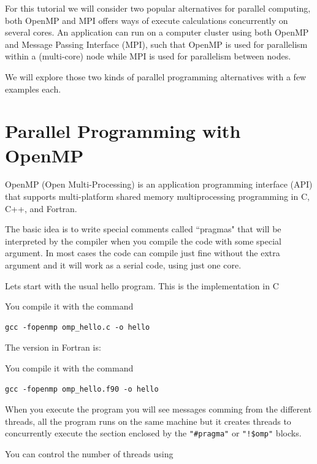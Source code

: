 For this tutorial we will consider two popular alternatives for parallel computing, both OpenMP and MPI offers ways of execute calculations concurrently on several cores.
An application can run on a computer cluster using both OpenMP and Message Passing Interface (MPI), such that OpenMP is used for parallelism within a (multi-core) node while MPI is used for parallelism between nodes.

We will explore those two kinds of parallel programming alternatives with a few examples each.

\section{Parallel Programming with OpenMP}

OpenMP (Open Multi-Processing) is an application programming interface (API) that supports multi-platform shared memory multiprocessing programming in C, C++, and Fortran.

The basic idea is to write special comments called ``pragmas" that will be interpreted by the compiler when you compile the code with some special argument. In most cases the code can compile just fine without the extra argument and it will work as a serial code, using just one core.

Lets start with the usual hello program. This is the implementation in C 



You compile it with the command

\begin{lstlisting}
gcc -fopenmp omp_hello.c -o hello
\end{lstlisting}

The version in Fortran is:



You compile it with the command

\begin{lstlisting}
gcc -fopenmp omp_hello.f90 -o hello
\end{lstlisting}

When you execute the program you will see messages comming from the different threads, all the program runs on the same machine but it creates threads to concurrently execute the section enclosed by the \verb|"#pragma"| or \verb|"!$omp"|
blocks.

You can control the number of threads using

